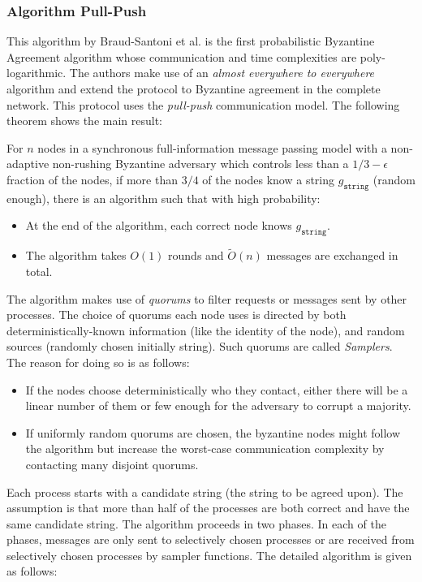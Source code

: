 

\subsubsection{Algorithm Pull-Push}
This algorithm by Braud-Santoni et al. \cite{BGH13} is the first probabilistic Byzantine Agreement algorithm whose communication and time complexities are poly-logarithmic. The authors make use of an \textit{almost everywhere to everywhere} algorithm and extend the protocol to Byzantine agreement in the complete network. This protocol uses the \textit{pull-push} communication model. The following theorem shows the main result: 


\begin{theorem}
For $n$ nodes in a synchronous full-information message passing model with a non-adaptive non-rushing Byzantine adversary which controls less than a $1/3 - \epsilon$ fraction of the nodes, if more than $3/4$ of the nodes know a string $g_{\mathtt{string}}$ (random enough), there is an algorithm such that with high probability:
\begin{itemize}
\item At the end of the algorithm, each correct node knows $g_{\mathtt{string}}$.
\item The algorithm takes $O(1)$ rounds and $\tilde{O}(n)$ messages are exchanged in total. 
\end{itemize}
\end{theorem}

The algorithm makes use of \textit{quorums} to filter requests or messages sent by other processes. The choice of quorums each node uses is directed by both deterministically-known information (like the identity of the node), and random sources (randomly chosen initially string). Such quorums are called \textit{Samplers}. The reason for doing so is as follows:
\begin{itemize}
\item If the nodes choose deterministically who they contact, either there will be a linear number of them or few enough for the adversary to corrupt a majority. 
\item If uniformly random quorums are chosen, the byzantine nodes might follow the algorithm but increase the worst-case communication complexity by contacting many disjoint quorums. 
\end{itemize}

Each process starts with a candidate string (the string to be agreed upon). The assumption is that more than half of the processes are both correct and have the same candidate string. The algorithm proceeds in two phases. In each of the phases, messages are only sent to selectively chosen processes or are received from selectively chosen processes by sampler functions. The detailed algorithm is given as follows:

